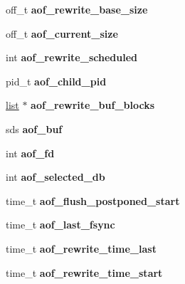 \begin{DoxyCompactItemize}
off\+\_\+t {\bfseries aof\+\_\+rewrite\+\_\+base\+\_\+size}
\item 
\mbox{\label{structredisServer_a1abbf5d317a89086cdff3caad5af2432}} 
off\+\_\+t {\bfseries aof\+\_\+current\+\_\+size}
\item 
\mbox{\label{structredisServer_ada97cfce45436d8413c7164d8541a72e}} 
int {\bfseries aof\+\_\+rewrite\+\_\+scheduled}
\item 
\mbox{\label{structredisServer_ac4a1a8002da7f45b6fd33eb3baf6b708}} 
pid\+\_\+t {\bfseries aof\+\_\+child\+\_\+pid}
\item 
\mbox{\label{structredisServer_a634ea05a861d933cfe0f029182881dbe}} 
\hyperlink{structlist}{list} $\ast$ {\bfseries aof\+\_\+rewrite\+\_\+buf\+\_\+blocks}
\item 
\mbox{\label{structredisServer_a91dd156cc607101d79b27651e672e617}} 
sds {\bfseries aof\+\_\+buf}
\item 
\mbox{\label{structredisServer_a17b841ec158b1c01425f0e84a687aeef}} 
int {\bfseries aof\+\_\+fd}
\item 
\mbox{\label{structredisServer_ac4105f82295047de0ec26a24839077a9}} 
int {\bfseries aof\+\_\+selected\+\_\+db}
\item 
\mbox{\label{structredisServer_abfebb2953462dc122f78e52af3c817ad}} 
time\+\_\+t {\bfseries aof\+\_\+flush\+\_\+postponed\+\_\+start}
\item 
\mbox{\label{structredisServer_ad167fefc4ad8ba4b636fe311a8023109}} 
time\+\_\+t {\bfseries aof\+\_\+last\+\_\+fsync}
\item 
\mbox{\label{structredisServer_a3c847f842bf26c39d8a6286066e8fed2}} 
time\+\_\+t {\bfseries aof\+\_\+rewrite\+\_\+time\+\_\+last}
\item 
\mbox{\label{structredisServer_a8be8ecaf6525adf5ae2c9e1dcc7dbeee}} 
time\+\_\+t {\bfseries aof\+\_\+rewrite\+\_\+time\+\_\+start}

\end{DoxyCompactItemize}
